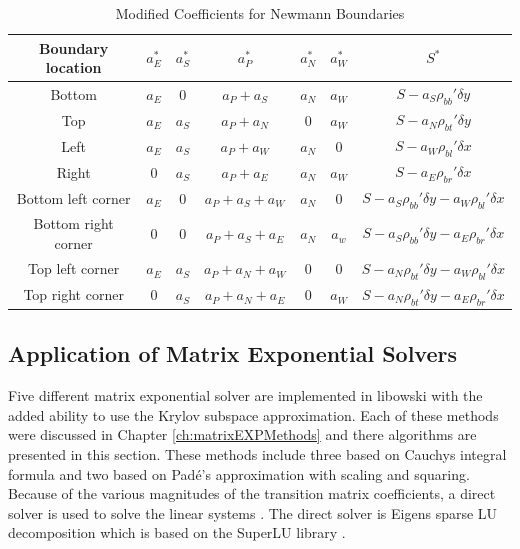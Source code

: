 \begin{table}[t]
    \caption{\label{tab:newmannBoundaries} Modified Coefficients for Newmann Boundaries}
    \centering
    \begin{tabular}{c|c|c|c|c|c|c}
    \hline
    \textbf{Boundary location} & \textbf{$a_{E}^{*}$} & \textbf{$a_{S}^{*}$} & \textbf{$a_{P}^{*}$} & \textbf{$a_{N}^{*}$} & \textbf{$a_{W}^{*}$} & \textbf{$S^{*}$} \\ [0.5ex]
    \hline
    \hline
    Bottom & $a_{E}$ & $0$ & $a_{P} + a_{S}$ & $a_{N}$ & $a_{W}$ & $S - a_{S}\rho_{bb}'\delta y$\\ \hline
    Top & $a_{E}$ & $a_{S}$ & $a_{P} + a_{N}$ & $0$ & $a_{W}$ & $S - a_{N}\rho_{bt}'\delta y$ \\ \hline 
    Left & $a_{E}$ & $a_{S}$ & $a_{P} + a_{W}$ & $a_{N}$ & $0$ & $S - a_{W}\rho_{bl}'\delta x$  \\ \hline
    Right & $0$ & $a_{S}$ & $a_{P} + a_{E}$ & $a_{N}$ & $a_{W}$ & $S - a_{E}\rho_{br}'\delta x$  \\ \hline
    Bottom left corner & $a_{E}$ & $0$ & $a_{P} + a_{S} + a_{W}$ & $a_{N}$ & $0$ & $S - a_{S}\rho_{bb}'\delta y - a_{W}\rho_{bl}'\delta x$ \\ \hline
    Bottom right corner & $0$ & $0$ & $a_{P} + a_{S} + a_{E}$ & $a_{N}$ & $a_{w}$ & $S - a_{S}\rho_{bb}'\delta y - a_{E}\rho_{br}'\delta x$ \\ \hline
    Top left corner & $a_{E}$ & $a_{S}$ & $a_{P} + a_{N} + a_{W}$ & $0$ & $0$ & $S - a_{N}\rho_{bt}'\delta y - a_{W}\rho_{bl}'\delta x$ \\ \hline
    Top right corner & $0$ & $a_{S}$ & $a_{P} + a_{N} + a_{E}$ & $0$ & $a_{W}$ & $S - a_{N}\rho_{bt}'\delta y - a_{E}\rho_{br}'\delta x$ \\ \hline
    \end{tabular}
\end{table}

\subsection{Application of Matrix Exponential Solvers}
Five different matrix exponential solver are implemented in libowski with the added ability to use the Krylov subspace approximation. Each of these methods were discussed in Chapter \ref{ch:matrixEXPMethods} and there algorithms are presented in this section. These methods include three based on Cauchys integral formula and two based on Pad\'e's approximation with scaling and squaring. Because of the  various magnitudes of the transition matrix coefficients, a direct solver is used to solve the linear systems \cite{pusa2013}. The direct solver is Eigens sparse LU decomposition which is based on the SuperLU library \cite{eigen} \cite{superlu99}. 

